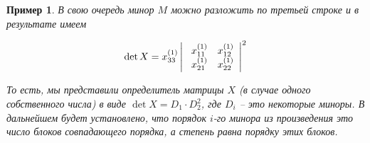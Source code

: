 \documentclass[11pt, a4paper]{article}
\newtheorem{example}{Пример}
\begin{document}
\begin{example}
    В свою очередь минор $M$ можно разложить по третьей строке и в результате имеем

    $$
    \det X = x_{33}^{(1)}
    \left|\
        \begin{array}{c c}
            x_{11}^{(1)} & x_{12}^{(1)}  \\
            x_{21}^{(1)} & x_{22}^{(1)}  \\
        \end{array}
    \right|^2
    $$

    То есть, мы представили определитель матрицы $X$ (в случае одного собственного числа) в виде $\det X = D_1 \cdot D_2^2$, где $D_i$ -- это некоторые миноры.
    В дальнейшем будет установлено, что порядок $i$-го минора из произведения это число блоков совпадающего порядка, а степень равна порядку этих блоков. 
\end{example}
\end{document}
